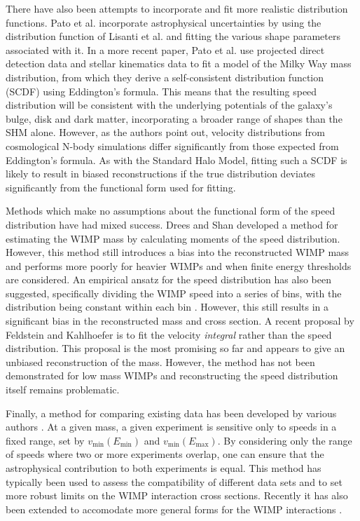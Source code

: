 There have also been attempts to incorporate and fit more realistic distribution functions. Pato et al. \cite{Pato:2011} incorporate astrophysical uncertainties by using the distribution function of Lisanti et al. \cite{Lisanti:2010} and fitting the various shape parameters associated with it. In a more recent paper, Pato et al. \cite{Pato:2013} use projected direct detection data and stellar kinematics data to fit a model of the Milky Way mass distribution, from which they derive a self-consistent distribution function (SCDF) using Eddington's formula. This means that the resulting speed distribution will be consistent with the underlying potentials of the galaxy's bulge, disk and dark matter, incorporating a broader range of shapes than the SHM alone. However, as the authors point out, velocity distributions from cosmological N-body simulations differ significantly from those expected from Eddington's formula. As with the Standard Halo Model, fitting such a SCDF is likely to result in biased reconstructions if the true distribution deviates significantly from the functional form used for fitting.

Methods which make no assumptions about the functional form of the speed distribution have had mixed success. Drees and Shan \cite{Drees:2007, Drees:2008} developed a method for estimating the WIMP mass by calculating moments of the speed distribution. However, this method still introduces a bias into the reconstructed WIMP mass and performs more poorly for heavier WIMPs and when finite energy thresholds are considered. An empirical ansatz for the speed distribution has also been suggested, specifically dividing the WIMP speed into a series of bins, with the distribution being constant within each bin \cite{Peter:2011}. However, this still results in a significant bias in the reconstructed mass and cross section. A recent proposal by Feldstein and Kahlhoefer \cite{Feldstein:2014} is to fit the velocity \textit{integral} rather than the speed distribution. This proposal is the most promising so far and appears to give an unbiased reconstruction of the mass. However, the method has not been demonstrated for low mass WIMPs and reconstructing the speed distribution itself remains problematic.

Finally, a method for comparing existing data has been developed by various authors \cite{Fox:2011b,Frandsen:2012, Gondolo:2012}. At a given mass, a given experiment is sensitive only to speeds in a fixed range, set by $v_\textrm{min}(E_\textrm{min})$ and $v_\textrm{min}(E_\textrm{max})$. By considering only the range of speeds where two or more experiments overlap, one can ensure that the astrophysical contribution to both experiments is equal. This method has typically been used to assess the compatibility of different data sets and to set more robust limits on the WIMP interaction cross sections. Recently it has also been extended to accomodate more general forms for the WIMP interactions \cite{DelNobile:2013}.

